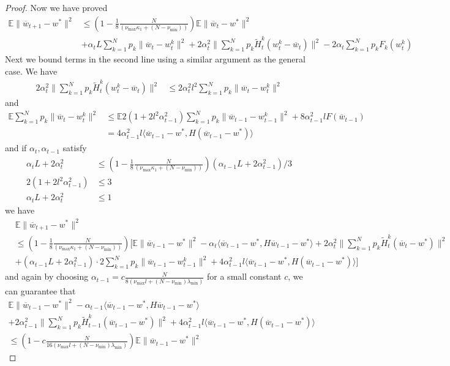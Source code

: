 \begin{proof}
	Now we have proved 
	\begin{align*}
	\mathbb{E}\|\overline{w}_{t+1}-w^{\ast}\|^{2} & \leq(1-\frac{1}{8}\frac{N}{(\nu_{\max}\kappa_{1}+(N-\nu_{\min}))})\mathbb{E}\|\overline{w}_{t}-w^{\ast}\|^{2}\\
	& +\alpha_{t}L\sum_{k=1}^{N}p_{k}\|\overline{w}_{t}-w_{t}^{k}\|^{2}+2\alpha_{t}^{2}\|\sum_{k=1}^{N}p_{k}\tilde{H}_{t}^{k}(w_{t}^{k}-\overline{w}_{t})\|^{2}-2\alpha_{t}\sum_{k=1}^{N}p_{k}F_{k}(w_{t}^{k})
	\end{align*}
	Next we bound terms in the second line using a similar argument as
	the general case. We have 
	\begin{align*}
	2\alpha_{t}^{2}\|\sum_{k=1}^{N}p_{k}\tilde{H}_{t}^{k}(w_{t}^{k}-\overline{w}_{t})\|^{2} & \leq2\alpha_{t}^{2}l^{2}\sum_{k=1}^{N}p_{k}\|\overline{w}_{t}-w_{t}^{k}\|^{2}
	\end{align*}
	and 
	\begin{align*}
	\mathbb{E}\sum_{k=1}^{N}p_{k}\|\overline{w}_{t}-w_{t}^{k}\|^{2} & \leq\mathbb{E}2(1+2l^{2}\alpha_{t-1}^{2})\sum_{k=1}^{N}p_{k}\|\overline{w}_{t-1}-w_{t-1}^{k}\|^{2}+8\alpha_{t-1}^{2}lF(\overline{w}_{t-1})\\
	& =4\alpha_{t-1}^{2}l\langle\overline{w}_{t-1}-w^{\ast},H(\overline{w}_{t-1}-w^{\ast})\rangle
	\end{align*}
	and if $\alpha_{t},\alpha_{t-1}$ satisfy 
	\begin{align*}
	\alpha_{t}L+2\alpha_{t}^{2} & \leq(1-\frac{1}{8}\frac{N}{(\nu_{\max}\kappa_{1}+(N-\nu_{\min}))})(\alpha_{t-1}L+2\alpha_{t-1}^{2})/3\\
	2(1+2l^{2}\alpha_{t-1}^{2}) & \leq3\\
	\alpha_{t}L+2\alpha_{t}^{2} & \leq1
	\end{align*}
	we have 
	\begin{align*}
	& \mathbb{E}\|\overline{w}_{t+1}-w^{\ast}\|^{2}\\
	& \leq(1-\frac{1}{8}\frac{N}{(\nu_{\max}\kappa_{1}+(N-\nu_{\min}))})[\mathbb{E}\|\overline{w}_{t-1}-w^{\ast}\|^{2}-\alpha_{t}\langle\overline{w}_{t-1}-w^{\ast},H\overline{w}_{t-1}-w^{\ast}\rangle+2\alpha_{t}^{2}\|\sum_{k=1}^{N}p_{k}\tilde{H}_{t}^{k}(\overline{w}_{t}-w^{\ast})\|^{2}\\
	& +(\alpha_{t-1}L+2\alpha_{t-1}^{2})\cdot2\sum_{k=1}^{N}p_{k}\|\overline{w}_{t-1}-w_{t-1}^{k}\|^{2}+4\alpha_{t-1}^{2}l\langle\overline{w}_{t-1}-w^{\ast},H(\overline{w}_{t-1}-w^{\ast})\rangle]
	\end{align*}
	and again by choosing $\alpha_{t-1}=c\frac{N}{8(\nu_{\max}l+(N-\nu_{\min})\lambda_{\min})}$
	for a small constant $c$, we can guarantee that 
	\begin{align*}
	\mathbb{E}\|\overline{w}_{t-1}-w^{\ast}\|^{2}-\alpha_{t-1}\langle\overline{w}_{t-1}-w^{\ast},H\overline{w}_{t-1}-w^{\ast}\rangle\\
	+2\alpha_{t-1}^{2}\|\sum_{k=1}^{N}p_{k}\tilde{H}_{t-1}^{k}(\overline{w}_{t-1}-w^{\ast})\|^{2}+4\alpha_{t-1}^{2}l\langle\overline{w}_{t-1}-w^{\ast},H(\overline{w}_{t-1}-w^{\ast})\rangle\\
	\leq(1-c\frac{N}{16(\nu_{\max}l+(N-\nu_{\min})\lambda_{\min})})\mathbb{E}\|\overline{w}_{t-1}-w^{\ast}\|^{2}
	\end{align*}
	

\end{proof}
